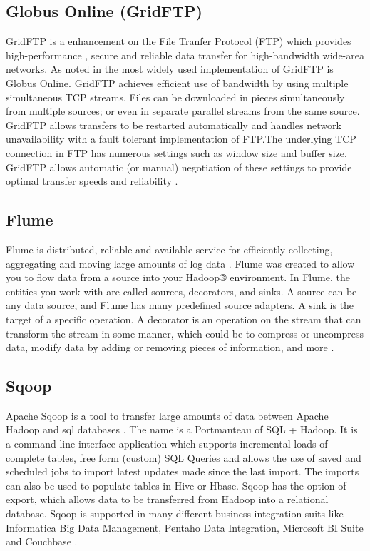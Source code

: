 \subsection{ Globus Online (GridFTP)}

     GridFTP is a enhancement on the File Tranfer Protocol (FTP) which
     provides high-performance , secure and reliable data transfer for
     high-bandwidth wide-area networks. As noted in
     \cite{www-GlobusOnline} the most widely used implementation of
     GridFTP is Globus Online. GridFTP achieves efficient use of
     bandwidth by using multiple simultaneous TCP streams.  Files can
     be downloaded in pieces simultaneously from multiple sources; or
     even in separate parallel streams from the same source. GridFTP
     allows transfers to be restarted automatically and handles
     network unavailability with a fault tolerant implementation of
     FTP.The underlying TCP connection in FTP has numerous settings
     such as window size and buffer size. GridFTP allows automatic (or
     manual) negotiation of these settings to provide optimal transfer
     speeds and reliability .


\subsection{ Flume}

     Flume is distributed, reliable and available service for
     efficiently collecting, aggregating and moving large amounts of
     log data \cite{apache-flume}. Flume was created to allow you to
     flow data from a source into your Hadoop® environment.  In Flume,
     the entities you work with are called sources, decorators, and
     sinks. A source can be any data source, and Flume has many
     predefined source adapters. A sink is the target of a specific
     operation. A decorator is an operation on the stream that can
     transform the stream in some manner, which could be to compress
     or uncompress data, modify data by adding or removing pieces of
     information, and more \cite{ibm-flume}.

\subsection{ Sqoop}
     
     Apache Sqoop is a tool to transfer large amounts of data between
     Apache Hadoop and sql databases \cite{www-sqoop}. The name is a
     Portmanteau of SQL + Hadoop. It is a command line interface
     application which supports incremental loads of complete tables,
     free form (custom) SQL Queries and allows the use of saved and
     scheduled jobs to import latest updates made since the last
     import. The imports can also be used to populate tables in Hive
     or Hbase. Sqoop has the option of export, which allows data to be
     transferred from Hadoop into a relational database. Sqoop is
     supported in many different business integration suits like
     Informatica Big Data Management, Pentaho Data Integration,
     Microsoft BI Suite and Couchbase \cite{sqoop-wiki}.

